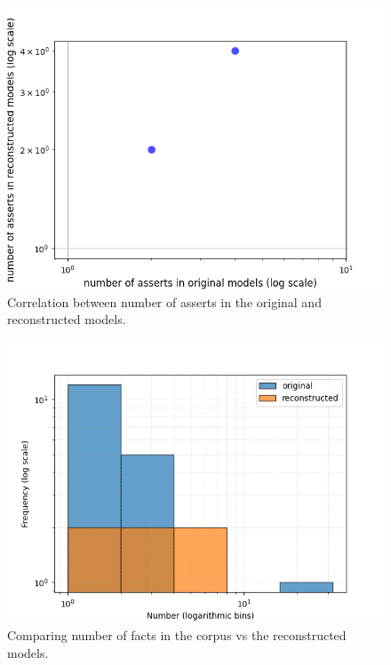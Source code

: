 \documentclass[conference]{IEEEtran}
\begin{document}
    
    \begin{figure}[htbp]
    \centerline{\includegraphics[width=\linewidth]{"./Correlation between number of asserts in the original and reconstructed models.png"}}
    \caption{Correlation between number of asserts in the original and reconstructed models.}
    \label{fig}
    \end{figure}
    
    
    \begin{figure}[htbp]
    \centerline{\includegraphics[width=\linewidth]{"./Comparing number of facts in the corpus vs the reconstructed models.png"}}
    \caption{Comparing number of facts in the corpus vs the reconstructed models.}
    \label{fig}
    \end{figure}
    
\end{document}
